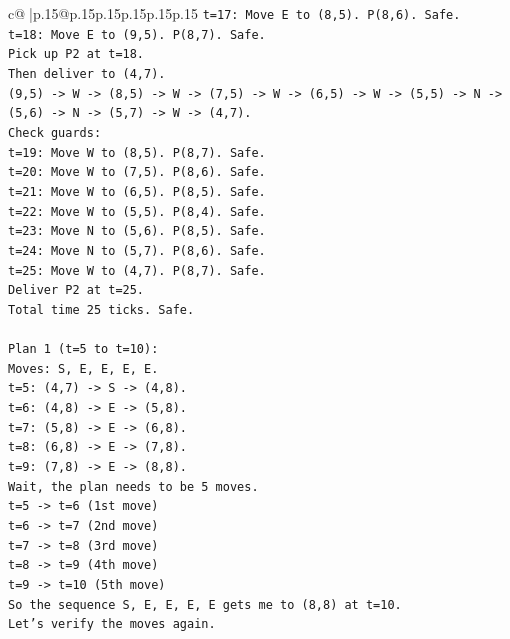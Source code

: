 \documentclass{article}
\begin{document}
{\begin{supertabular}{c@{$\;$}|p{.15\linewidth}@{}p{.15\linewidth}p{.15\linewidth}p{.15\linewidth}p{.15\linewidth}p{.15\linewidth}}
{{{\texttt{t=17: Move E to (8,5). P(8,6). Safe.} \\
\texttt{t=18: Move E to (9,5). P(8,7). Safe.} \\
\texttt{Pick up P2 at t=18.} \\
\texttt{Then deliver to (4,7).} \\
\texttt{(9,5) {-}> W {-}> (8,5) {-}> W {-}> (7,5) {-}> W {-}> (6,5) {-}> W {-}> (5,5) {-}> N {-}> (5,6) {-}> N {-}> (5,7) {-}> W {-}> (4,7).} \\
\texttt{Check guards:} \\
\texttt{t=19: Move W to (8,5). P(8,7). Safe.} \\
\texttt{t=20: Move W to (7,5). P(8,6). Safe.} \\
\texttt{t=21: Move W to (6,5). P(8,5). Safe.} \\
\texttt{t=22: Move W to (5,5). P(8,4). Safe.} \\
\texttt{t=23: Move N to (5,6). P(8,5). Safe.} \\
\texttt{t=24: Move N to (5,7). P(8,6). Safe.} \\
\texttt{t=25: Move W to (4,7). P(8,7). Safe.} \\
\texttt{Deliver P2 at t=25.} \\
\texttt{Total time 25 ticks. Safe.} \\
\\ 
\texttt{Plan 1 (t=5 to t=10):} \\
\texttt{Moves: S, E, E, E, E.} \\
\texttt{t=5: (4,7) {-}> S {-}> (4,8).} \\
\texttt{t=6: (4,8) {-}> E {-}> (5,8).} \\
\texttt{t=7: (5,8) {-}> E {-}> (6,8).} \\
\texttt{t=8: (6,8) {-}> E {-}> (7,8).} \\
\texttt{t=9: (7,8) {-}> E {-}> (8,8).} \\
\texttt{Wait, the plan needs to be 5 moves.} \\
\texttt{t=5 {-}> t=6 (1st move)} \\
\texttt{t=6 {-}> t=7 (2nd move)} \\
\texttt{t=7 {-}> t=8 (3rd move)} \\
\texttt{t=8 {-}> t=9 (4th move)} \\
\texttt{t=9 {-}> t=10 (5th move)} \\
\texttt{So the sequence S, E, E, E, E gets me to (8,8) at t=10.} \\
\texttt{Let's verify the moves again.} \\
}}}
\end{supertabular}}
\end{document}
